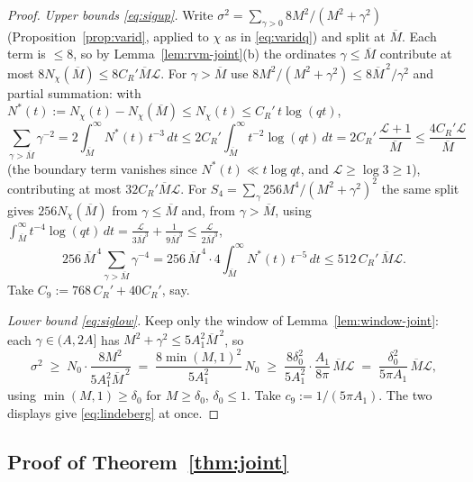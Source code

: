 \begin{proof}
\emph{Upper bounds \eqref{eq:sigup}.} Write
$\sigma^2=\sum_{\gamma>0}8M^2/(M^2+\gamma^2)$
(Proposition~\ref{prop:varid}, applied to $\chi$ as in
\eqref{eq:varidq}) and split at $\overline M$. Each term is $\le8$, so
by Lemma~\ref{lem:rvm-joint}(b) the ordinates $\gamma\le\overline M$
contribute at most $8N_\chi(\overline M)\le8C_R'\overline M\mathcal L$.
For $\gamma>\overline M$ use $8M^2/(M^2+\gamma^2)\le8\overline
M^{\,2}/\gamma^2$ and partial summation: with
$N^*(t):=N_\chi(t)-N_\chi(\overline M)\le N_\chi(t)\le
C_R'\,t\log(qt)$,
\[
\sum_{\gamma>\overline M}\gamma^{-2}
=2\int_{\overline M}^\infty N^*(t)\,t^{-3}\,dt
\le2C_R'\int_{\overline M}^\infty t^{-2}\log(qt)\,dt
=2C_R'\,\frac{\mathcal L+1}{\overline M}
\le\frac{4C_R'\mathcal L}{\overline M}
\]
(the boundary term vanishes since $N^*(t)\ll t\log qt$, and
$\mathcal L\ge\log3\ge1$), contributing at most
$32C_R'\overline M\mathcal L$. For $S_4=\sum_\gamma256M^4/(M^2+\gamma^2)^2$
the same split gives $256N_\chi(\overline M)$ from
$\gamma\le\overline M$ and, from $\gamma>\overline M$, using
$\int_{\overline M}^\infty t^{-4}\log(qt)\,dt
=\tfrac{\mathcal L}{3\overline M^{3}}+\tfrac{1}{9\overline M^{3}}
\le\tfrac{\mathcal L}{2\overline M^{3}}$,
\[
256\,\overline M^{\,4}\sum_{\gamma>\overline M}\gamma^{-4}
=256\,\overline M^{\,4}\cdot4\int_{\overline M}^\infty
N^*(t)\,t^{-5}\,dt
\le512\,C_R'\,\overline M\mathcal L .
\]
Take $C_9:=768\,C_R'+40C_R'$, say.

\emph{Lower bound \eqref{eq:siglow}.} Keep only the window of
Lemma~\ref{lem:window-joint}: each $\gamma\in(A,2A]$ has
$M^2+\gamma^2\le5A_1^2\overline M^{\,2}$, so
\[
\sigma^2\;\ge\;N_0\cdot\frac{8M^2}{5A_1^2\overline M^{\,2}}
\;=\;\frac{8\min(M,1)^2}{5A_1^2}\,N_0
\;\ge\;\frac{8\delta_0^{2}}{5A_1^2}\cdot
\frac{A_1}{8\pi}\,\overline M\mathcal L
\;=\;\frac{\delta_0^{2}}{5\pi A_1}\,\overline M\mathcal L ,
\]
using $\min(M,1)\ge\delta_0$ for $M\ge\delta_0$, $\delta_0\le1$. Take
$c_9:=1/(5\pi A_1)$. The two displays give
\eqref{eq:lindeberg} at once.
\end{proof}

\subsection*{Proof of Theorem~\ref{thm:joint}}

